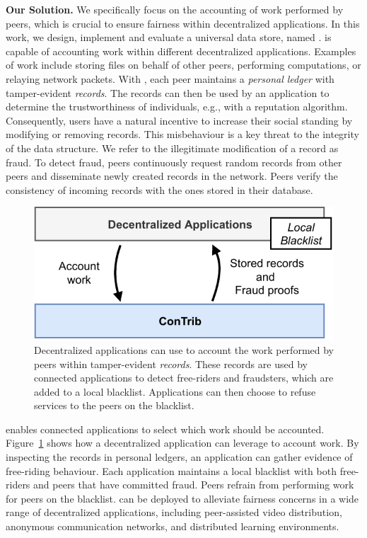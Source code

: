 
\textbf{Our Solution.}
We specifically focus on the accounting of work performed by peers, which is crucial to ensure fairness within decentralized applications.
In this work, we design, implement and evaluate a universal data store, named \ModelName{}.
\ModelName{} is capable of accounting work within different decentralized applications.
Examples of work include storing files on behalf of other peers, performing computations, or relaying network packets.
With \ModelName{}, each peer maintains a \emph{personal ledger} with tamper-evident \emph{records}.
The \ModelName{} records can then be used by an application to determine the trustworthiness of individuals, e.g., with a reputation algorithm.
Consequently, users have a natural incentive to increase their social standing by modifying or removing records.
This misbehaviour is a key threat to the integrity of the \ModelName{} data structure.
We refer to the illegitimate modification of a record as fraud.
To detect fraud, peers continuously request random records from other peers and disseminate newly created records in the network.
Peers verify the consistency of incoming records with the ones stored in their database.

\begin{figure}[t]
	\centering
	\includegraphics[width=.7\linewidth]{trustchain/assets/contrib_app_interaction}
	\caption{Decentralized applications can use \ModelName{} to account the work performed by peers within tamper-evident \emph{records}. These records are used by connected applications to detect free-riders and fraudsters, which are added to a local blacklist. Applications can then choose to refuse services to the peers on the blacklist.}
	\label{fig:interaction_with_apps}
\end{figure}

\ModelName{} enables connected applications to select which work should be accounted.
Figure~\ref{fig:interaction_with_apps} shows how a decentralized application can leverage \ModelName{} to account work.
By inspecting the records in personal ledgers, an application can gather evidence of free-riding behaviour.
Each application maintains a local blacklist with both free-riders and peers that have committed fraud.
Peers refrain from performing work for peers on the blacklist.
\ModelName{} can be deployed to alleviate fairness concerns in a wide range of decentralized applications, including peer-assisted video distribution, anonymous communication networks, and distributed learning environments.

